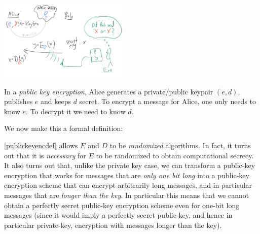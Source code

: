 \begin{marginfigure}
\centering
\includegraphics[width=\linewidth, height=1.5in, keepaspectratio]{../figure/publickeyenc.png}
\caption{In a \emph{public key encryption}, Alice generates a
private/public keypair \((e,d)\), publishes \(e\) and keeps \(d\)
secret. To encrypt a message for Alice, one only needs to know \(e\). To
decrypt it we need to know \(d\).}
\label{publickeyencfig}
\end{marginfigure}

We now make this a formal definition:

\hypertarget{publickeyencdef}{}

\cref{publickeyencdef} allows \(E\) and \(D\) to be \emph{randomized}
algorithms. In fact, it turns out that it is \emph{necessary} for \(E\)
to be randomized to obtain computational secrecy. It also turns out
that, unlike the private key case, we can transform a public-key
encryption that works for messages that are \emph{only one bit long}
into a public-key encryption scheme that can encrypt arbitrarily long
messages, and in particular messages that are \emph{longer than the
key}. In particular this means that we cannot obtain a perfectly secret
public-key encryption scheme even for one-bit long messages (since it
would imply a perfectly secret public-key, and hence in particular
private-key, encryption with messages longer than the key).


